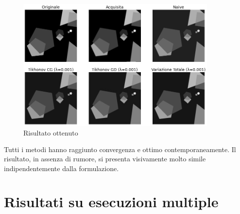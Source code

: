 \documentclass[11pt]{article}
\begin{document}
\begin{figure}[H]
    \centering
    \includegraphics[width=10cm]{semiconvergenza/3/deblur_all.png}
    \caption{Risultato ottenuto}
    \label{fig:semiconv_deblur3}
\end{figure}
Tutti i metodi hanno raggiunto convergenza e ottimo contemporaneamente. Il risultato, in assenza di rumore, si presenta visivamente molto simile indipendentemente dalla formulazione.

\section{Risultati su esecuzioni multiple}
\end{document}
